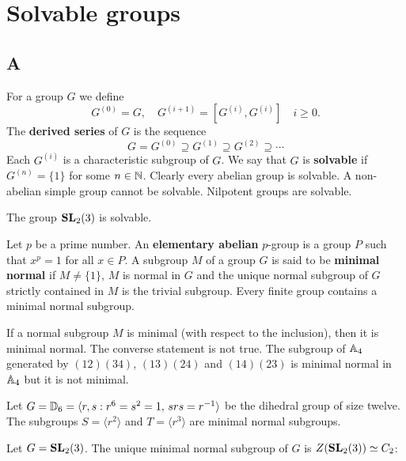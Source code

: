 \chapter{Solvable groups}
\label{solvable}

\section*{A}

For a group $G$ we define 
\[
		G^{(0)}=G,\quad
		G^{(i+1)}=[G^{(i)},G^{(i)}]\quad i\geq0.
\]
The \textbf{derived series} of $G$ is the sequence 
\[
G=G^{(0)}\supseteq G^{(1)}\supseteq G^{(2)}\supseteq\cdots
\]
Each $G^{(i)}$ is a characteristic subgroup of $G$. We say that 
$G$ is \textbf{solvable} if $G^{(n)}=\{1\}$ for some $n\in\mathbb{N}$. Clearly every abelian group
is solvable. A non-abelian simple group cannot be solvable. Nilpotent groups
are solvable.

\begin{exercise}
	The group $\mathbf{SL}_2(3)$ is solvable. 
\end{exercise}

Let $p$ be a prime number. An \textbf{elementary abelian} $p$-group is a group 
$P$ such that $x^p=1$ for all $x\in P$.
A subgroup $M$ of a group $G$ is said to be \textbf{minimal normal} if $M\ne\{1\}$,
$M$ is normal in $G$ and the unique normal subgroup of $G$ strictly contained in $M$ is
the trivial subgroup. Every finite group contains a minimal normal subgroup.  

\begin{example}
	If a normal subgroup $M$ is minimal (with respect to the inclusion), then it is
	minimal normal. The converse statement is not true. The subgroup of 
	$\mathbb{A}_4$ generated by $(12)(34)$, $(13)(24)$ and $(14)(23)$ is minimal normal in 
	$\mathbb{A}_4$ but it is not minimal. 
\end{example}

\begin{example}
	Let $G=\mathbb{D}_{6}=\langle r,s:r^6=s^2=1,\,srs=r^{-1}\rangle$ be the dihedral group
	of size twelve. The subgroups $S=\langle r^2\rangle$ 
	and $T=\langle r^3\rangle$ are minimal normal subgroups.  
\end{example}

\begin{exercise}
	Let $G=\mathbf{SL}_2(3)$. The unique minimal normal subgroup of $G$ is
	$Z(\mathbf{SL}_2(3))\simeq C_2$:
\end{exercise}

